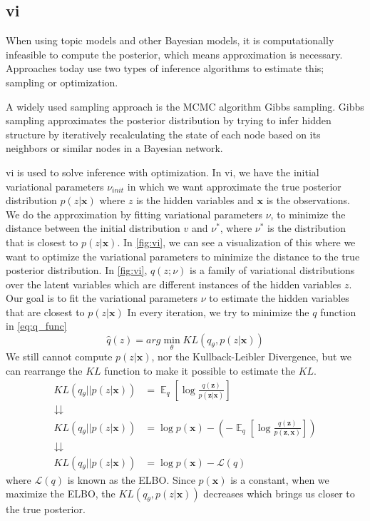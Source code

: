 \subsection{\acrlong{vi}}
When using topic models and other Bayesian models, it is computationally infeasible to compute the posterior, which means approximation is necessary. 
Approaches today use two types of inference algorithms to estimate this; sampling or optimization.

A widely used sampling approach is the MCMC algorithm Gibbs sampling.
Gibbs sampling approximates the posterior distribution by trying to infer hidden structure by iteratively recalculating the state of each node based on its neighbors or similar nodes in a Bayesian network.

\gls{vi} is used to solve inference with optimization.
In \gls{vi}, we have the initial variational parameters $\nu_{init}$ in which we want approximate the true posterior distribution $p(z|\textbf{x})$ where $z$ is the hidden variables and $\textbf{x}$ is the observations.
We do the approximation by fitting variational parameters $\nu$, to minimize the distance between the initial distribution $v$ and $\nu^*$, where $\nu^*$ is the distribution that is closest to $p(z|\textbf{x})$.
In \autoref{fig:vi}, we can see a visualization of this where we want to optimize the variational parameters to minimize the distance to the true posterior distribution.
In \autoref{fig:vi}, $q(z; \nu)$ is a family of variational distributions over the latent variables which are different instances of the hidden variables $z$.
Our goal is to fit the variational parameters $\nu$ to estimate the hidden variables that are closest to $p(z|\textbf{x})$
In every iteration, we try to minimize the $q$ function in \autoref{eq:q_func} 
\begin{equation}\label{eq:q_func}
	\hat{q}(z) = arg \min_{\theta} K\!L(q_\theta, p(z|\textbf{x}))
\end{equation}
We still cannot compute $p(z|\textbf{x})$, nor the Kullback-Leibler Divergence, but we can rearrange the $K\!L$ function to make it possible to estimate the $K\!L$.
\begin{align}
	K\!L(q_\theta || p(z|\textbf{x})) &= \mathop{\mathbb{E}}_{q}[\log\frac{q(\textbf{z})}{p(\textbf{z}|\textbf{x})}]\\
	\downdownarrows \\
	K\!L(q_\theta || p(z|\textbf{x})) &= \log p(\textbf{x}) - (-\mathop{\mathbb{E}}_{q}[\log\frac{q(\textbf{z})}{p(\textbf{z},\textbf{x})}]) \\
	\downdownarrows \\
	K\!L(q_\theta || p(z|\textbf{x})) &= \log p(\textbf{x}) - \mathcal{L}(q)
\end{align}
where $\mathcal{L}(q)$ is known as the ELBO.
Since $p(\textbf{x})$ is a constant, when we maximize the ELBO, the $K\!L(q_\theta, p(z|\textbf{x}))$ decreases which brings us closer to the true posterior.

